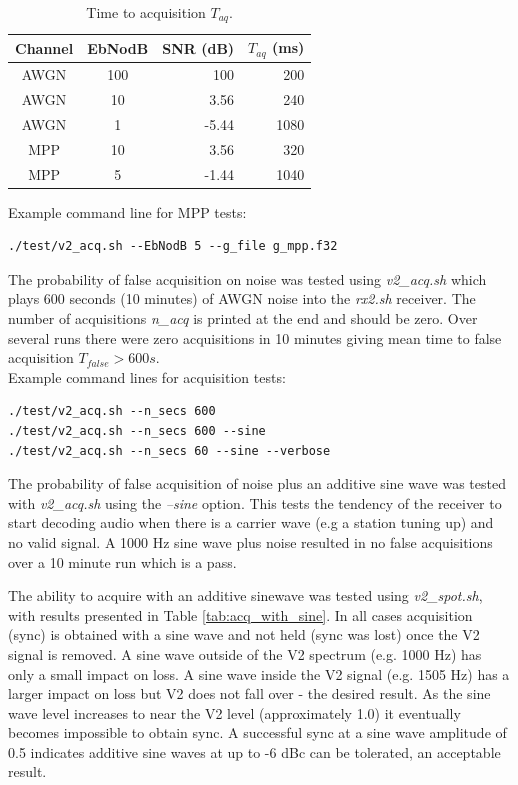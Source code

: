 \documentclass{article}
\begin{document}
\begin{table} [h]
\caption{Time to acquisition $T_{aq}$.}
\label{tab:time_to_acq}
\centering
\begin{tabular}{ c | c | r | r  }
 \hline
 Channel & EbNodB & SNR (\si{dB}) & $T_{aq}$ (ms)\\
 \hline
 AWGN & 100 & 100 & 200 \\
 AWGN & 10 & 3.56 &  240 \\
 AWGN & 1 & -5.44 & 1080 \\
 MPP & 10 & 3.56 & 320 \\
 MPP & 5 & -1.44 & 1040\\
 \hline
\end{tabular}
\end{table}

\noindent Example command line for MPP tests:

\begin{verbatim}
./test/v2_acq.sh --EbNodB 5 --g_file g_mpp.f32
\end{verbatim}

The probability of false acquisition on noise was tested using \emph{v2\_acq.sh} which plays 600 seconds (10 minutes) of AWGN noise into the \emph{rx2.sh} receiver.  The number of acquisitions \emph{n\_acq} is printed at the end and should be zero. Over several runs there were zero acquisitions in 10 minutes giving mean time to false acquisition $T_{false} > 600 \si{s}$. \\

\noindent Example command lines for acquisition tests:

\begin{verbatim}
./test/v2_acq.sh --n_secs 600
./test/v2_acq.sh --n_secs 600 --sine
./test/v2_acq.sh --n_secs 60 --sine --verbose
\end{verbatim}

The probability of false acquisition of noise plus an additive sine wave was tested with \emph{v2\_acq.sh} using the \emph{--sine} option.  This tests the tendency of the receiver to start decoding audio when there is a carrier wave (e.g a station tuning up) and no valid signal.  A 1000 Hz sine wave plus noise resulted in no false acquisitions over a 10 minute run which is a pass.

The ability to acquire with an additive sinewave was tested using \emph{v2\_spot.sh}, with results presented in Table \ref{tab:acq_with_sine}.  In all cases acquisition (sync) is obtained with a sine wave and not held (sync was lost) once the V2 signal is removed. A sine wave outside of the V2 spectrum (e.g. 1000 Hz) has only a small impact on loss.  A sine wave inside the V2 signal (e.g. 1505 Hz) has a larger impact on loss but V2 does not fall over - the desired result.  As the sine wave level increases to near the V2 level (approximately 1.0) it eventually becomes impossible to obtain sync.  A successful sync at a sine wave amplitude of 0.5 indicates additive sine waves at up to -6 \si{dBc} can be tolerated, an acceptable result.
\end{document}
